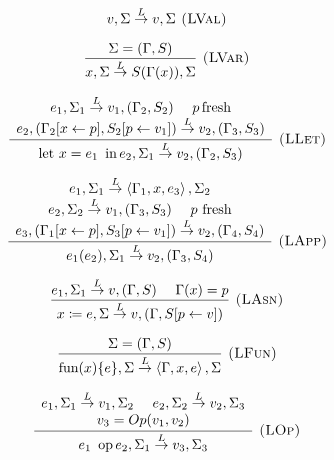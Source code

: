 \documentclass[english]{llncs}
\begin{document}
\begin{figure}[t]
{\footnotesize{}}%
\begin{minipage}[t]{0.59\columnwidth}%
{\footnotesize{}
\[
v,\Sigma\overset{L}{\rightarrow}v,\Sigma\textsc{ (LVal)}
\]
}{\footnotesize \par}

{\footnotesize{}
\[
\frac{\Sigma=(\Gamma,S)}{x,\Sigma\overset{L}{\rightarrow}S(\Gamma(x)),\Sigma}\textsc{ (LVar)}
\]
}{\footnotesize \par}

{\footnotesize{}
\[
\frac{\begin{array}[t]{c}
e_{1},\Sigma_{1}\overset{L}{\rightarrow}v_{1},(\Gamma_{2},S_{2})\,\,\,\,\,\,\,\, p\,\mbox{fresh}\\
e_{2},(\Gamma_{2}[x\leftarrow p],S_{2}[p\leftarrow v_{1}])\overset{L}{\rightarrow}v_{2},(\Gamma_{3},S_{3})
\end{array}}{\mbox{let \ensuremath{x=e_{1}}\,\ in\,\ensuremath{e_{2}}},\Sigma_{1}\overset{L}{\rightarrow}v_{2},(\Gamma_{2},S_{3})}\textsc{ (LLet)}
\]
}{\footnotesize \par}

{\footnotesize{}
\[
\frac{\begin{array}[t]{c}
e_{1},\Sigma_{1}\overset{L}{\rightarrow}\left\langle \Gamma_{1},x,e_{3}\right\rangle ,\Sigma_{2}\\
e_{2},\Sigma_{2}\overset{L}{\rightarrow}v_{1},(\Gamma_{3},S_{3})\,\,\,\,\,\,\,\,\mbox{\ensuremath{p}\ fresh}\\
e_{3},(\Gamma_{1}[x\leftarrow p],S_{3}[p\leftarrow v_{1}])\overset{L}{\rightarrow}v_{2},(\Gamma_{4},S_{4})
\end{array}}{e_{1}(e_{2}),\Sigma_{1}\overset{L}{\rightarrow}v_{2},(\Gamma_{3},S_{4})}\textsc{ (LApp)}
\]
}{\footnotesize \par}

{\footnotesize{}
\[
\frac{e_{1},\Sigma_{1}\overset{L}{\rightarrow}v,(\Gamma,S)\,\,\,\,\,\,\,\,\Gamma(x)=p}{x\coloneqq e,\Sigma\overset{L}{\rightarrow}v,(\Gamma,S[p\leftarrow v])}\textsc{ (LAsn)}
\]
}{\footnotesize \par}

{\footnotesize{}
\[
\frac{\Sigma=(\Gamma,S)}{\mbox{fun(\ensuremath{x})\{\ensuremath{e}\}},\Sigma\overset{L}{\rightarrow}\left\langle \Gamma,x,e\right\rangle ,\Sigma}\textsc{ (LFun)}
\]
}{\footnotesize \par}

{\footnotesize{}
\[
\frac{\begin{array}[t]{c}
e_{1},\Sigma_{1}\overset{L}{\rightarrow}v_{1},\Sigma_{2}\,\,\,\,\,\,\,\, e_{2},\Sigma_{2}\overset{L}{\rightarrow}v_{2},\Sigma_{3}\\
v_{3}=Op(v_{1},v_{2})
\end{array}}{e_{1}\mbox{\,\ op\,}e_{2},\Sigma_{1}\overset{L}{\rightarrow}v_{3},\Sigma_{3}}\textsc{ (LOp)}
\]
}{\footnotesize \par}


\end{minipage}
\end{figure}
\end{document}
